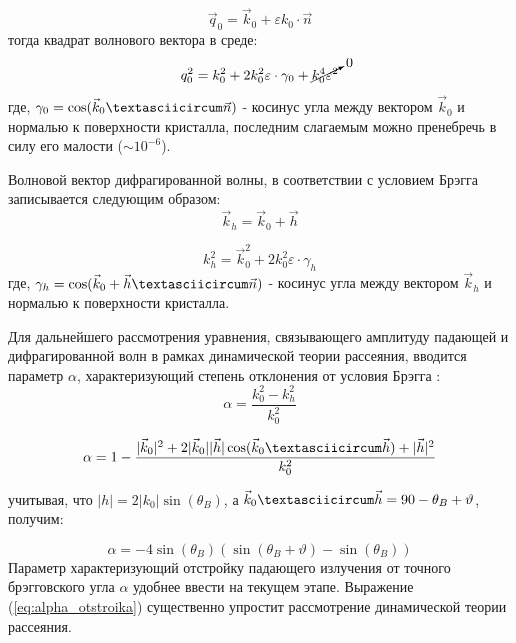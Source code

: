  \begin{equation}
   \vec{q}_0 = \vec{k}_0 + \varepsilon k_0 \cdot \vec{n}
  \end{equation}
\noindent
тогда квадрат волнового вектора в среде:
\begin{equation}
   q_0^2 = k_0^2 + 2k_0^2 \varepsilon \cdot \gamma_0 + \cancelto{0}{k_0^4  \varepsilon^2}
   \label{eq:k_0_squred}
 \end{equation}
\noindent
где, $\gamma_0 = \cos(\vec{k}_0 \textasciicircum \vec{n})$ - косинус угла между вектором $\vec{k}_0$ и нормалью к поверхности кристалла,
последним слагаемым можно пренебречь в силу его малости ($\sim 10^{-6}$).

  Волновой вектор дифрагированной волны, в соответствии с условием Брэгга записывается следующим образом:
  $$\vec{k}_h = \vec{k}_0+\vec{h}$$

  \begin{equation}
     k_h^2 = \vec{k}_0^2+2k_0^2 \varepsilon \cdot \gamma_h
     \label{eq:k_h_squred}
   \end{equation}
   где, $\gamma_h = \cos(\vec{k}_0+ \vec{h} \textasciicircum \vec{n})$ - косинус угла между вектором $\vec{k}_h$ и нормалью к поверхности кристалла.

Для дальнейшего рассмотрения уравнения, связывающего амплитуду падающей и дифрагированной волн в рамках
динамической теории рассеяния, вводится параметр $\alpha$, характеризующий степень отклонения от условия Брэгга \cite{Bushuev_Oreshko_2002}:
\begin{equation}
   \alpha = \frac{k_0^2-k_h^2}{k_0^2}
   \label{eq:alpha}
\end{equation}


$$  \alpha = 1 - \frac{|\vec{k}_0|^2+2|\vec{k}_0||\vec{h}|\cos(\vec{k}_0 \textasciicircum \vec{h})+|\vec{h}|^2}{k_0^2}$$

\noindent
учитывая, что $ |h| = 2|k_0| \sin(\theta_B) $, а $\vec{k}_0 \textasciicircum \vec{h} = 90-\theta_B+\vartheta$, получим:

\begin{equation}
   \alpha = -4\sin(\theta_B)(\sin(\theta_B+\vartheta)-\sin(\theta_B))
   \label{eq:alpha_otstroika}
\end{equation}
Параметр характеризующий отстройку падающего излучения от точного брэгговского угла $\alpha$ удобнее ввести на
текущем этапе. Выражение (\ref{eq:alpha_otstroika}) существенно упростит рассмотрение динамической теории рассеяния.
